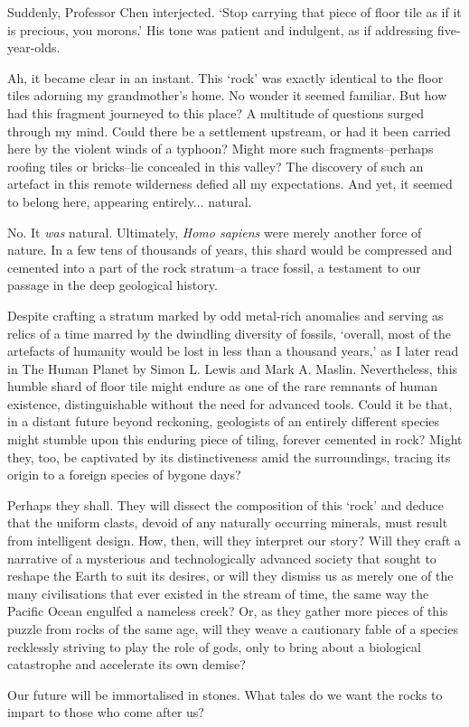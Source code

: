\documentclass[a4paper, 12pt, mla]{homework}
\begin{document}
Suddenly, Professor Chen interjected. 
`Stop carrying that piece of floor tile as if it is precious, you morons.' 
His tone was patient and indulgent, as if addressing five-year-olds.

Ah, it became clear in an instant. 
This `rock' was exactly identical to the floor tiles adorning my grandmother's home. 
No wonder it seemed familiar. 
But how had this fragment journeyed to this place? A multitude of questions surged through my mind. 
Could there be a settlement upstream, or had it been carried here by the violent winds of a typhoon? 
Might more such fragments--perhaps roofing tiles or bricks--lie concealed in this valley? 
The discovery of such an artefact in this remote wilderness defied all my expectations. 
And yet, it seemed to belong here, appearing entirely... natural.

No. 
It \textit{was} natural. 
Ultimately, \textit{Homo sapiens} were merely another force of nature. 
In a few tens of thousands of years, this shard would be compressed and cemented into a part of the rock stratum--a trace fossil, a testament to our passage in the deep geological history.

Despite crafting a stratum marked by odd metal-rich anomalies and serving as relics of a time marred by the dwindling diversity of fossils, 
`overall, most of the artefacts of humanity would be lost in less than a thousand years,' as I later read in The Human Planet by Simon L. Lewis and Mark A. Maslin. 
Nevertheless, this humble shard of floor tile might endure as one of the rare remnants of human existence, distinguishable without the need for advanced tools. 
Could it be that, in a distant future beyond reckoning, geologists of an entirely different species might stumble upon this enduring piece of tiling, forever cemented in rock? 
Might they, too, be captivated by its distinctiveness amid the surroundings, tracing its origin to a foreign species of bygone days?

Perhaps they shall. 
They will dissect the composition of this `rock' and deduce that the uniform clasts, devoid of any naturally occurring minerals, must result from intelligent design. 
How, then, will they interpret our story? 
Will they craft a narrative of a mysterious and technologically advanced society that sought to reshape the Earth to suit its desires, or will they dismiss us as merely one of the many civilisations that ever existed in the stream of time, the same way the Pacific Ocean engulfed a nameless creek? 
Or, as they gather more pieces of this puzzle from rocks of the same age, will they weave a cautionary fable of a species recklessly striving to play the role of gods, only to bring about a biological catastrophe and accelerate its own demise? 

Our future will be immortalised in stones. What tales do we want the rocks to impart to those who come after us?
\end{document}
